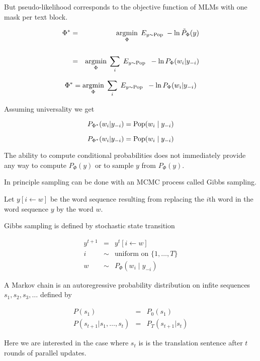 {\vfill
But pseudo-likelihood corresponds to the objective function of MLMs with one mask per text block.

\begin{eqnarray*}
\Phi^* & = & \operatorname*{argmin}_\Phi\; E_{y \sim \mathrm{Pop}}\;-\ln \tilde{P}_\Phi(y) \\
\\
& = & \operatorname*{argmin}_\Phi\; \sum_i\; E_{y \sim \mathrm{Pop}}\;\;-\ln P_\Phi(w_i|y_{-i})
\end{eqnarray*}


$$\Phi^* = \operatorname*{argmin}_\Phi\; \sum_i \; E_{y \sim \mathrm{Pop}}\;\;-\ln P_\Phi(w_i|y_{-i})$$

\vfill
Assuming universality we get

$$P_{\Phi^*}(w_i|y_{-i}) = \mathrm{Pop}(w_i\;|\;y_{-i})$$

$$P_{\Phi^*}(w_i|y_{-i}) = \mathrm{Pop}(w_i\;|\;y_{-i})$$

\vfill
The ability to compute conditional probabilities does not immediately provide any way to compute $P_\Phi(y)$ or to sample $y$ from $P_\Phi(y)$.

\vfill
In principle sampling can be done with an MCMC process called Gibbs sampling.


Let $y[i\leftarrow w]$ be the word sequence resulting from replacing the $i$th word in the word sequence $y$ by the word $w$.


\vfill
Gibbs sampling is defined by stochastic state transition

\begin{eqnarray*}
y^{t+1} & = & y^t[i\leftarrow w] \\
i & \sim & \mbox{uniform on $\{1,\ldots,T\}$} \\
w & \sim & P_\Phi(w_i\;|\;y_{-i})
\end{eqnarray*}


A Markov chain is an autoregressive probability distribution on infite sequences $s_1,s_2,s_3,\ldots$ defined by

\begin{eqnarray*}
P(s_1) & = & P_0(s_1) \\
P(s_{t+1}|s_1,\ldots,s_t) & = & P_T(s_{t+1}|s_t)
\end{eqnarray*}

\vfill
Here we are interested in the case where $s_t$ is is the translation sentence after $t$ rounds of parallel updates.

}
